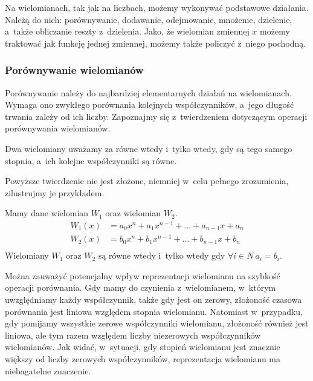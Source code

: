 Na wielomianach, tak jak na liczbach, możemy wykonywać podstawowe działania. Należą do nich: porównywanie, dodawanie, odejmowanie, mnożenie, dzielenie, a~także obliczanie reszty z~dzielenia. Jako, że wielomian zmiennej $x$ możemy traktować jak funkcję jednej zmiennej, możemy także policzyć z~niego pochodną.

\subsubsection{Porównywanie wielomianów}
Porównywanie należy do najbardziej elementarnych działań na wielomianach. Wymaga ono zwykłego porównania kolejnych współczynników, a~jego długość trwania zależy od ich liczby. Zapoznajmy się z~twierdzeniem dotyczącym operacji porównywania wielomianów.

\begin{theorem}
	$ $\\
	Dwa wielomiany uważamy za równe wtedy i~tylko wtedy, gdy są tego samego stopnia, a~ich kolejne współczynniki są równe.
\end{theorem}

Powyższe twierdzenie nie jest złożone, niemniej w~celu pełnego zrozumienia, zilustrujmy je przykładem. 

\begin{example}
	$ $\\
	Mamy dane wielomian $W_1$ oraz wielomian $W_2$.
	\begin{equation*}
	\begin{split}
	W_1(x) &= a_0x^n + a_1x^{n-1} + ... + a_{n-1}x + a_n \\
	W_2(x) &= b_0x^n + b_1x^{n-1} + ... + b_{n-1}x + b_n \\
	\end{split}
	\end{equation*}
	Wielomiany $W_1$ oraz $W_2 $ są równe wtedy i~tylko wtedy gdy
	$\forall{i\in N}\ a_i = b_i$.
\end{example}

Można zauważyć potencjalny wpływ reprezentacji wielomianu na szybkość operacji porównania. Gdy mamy do czynienia z~wielomianem, w~którym uwzględniamy każdy współczynnik, także gdy jest on zerowy, złożoność czasowa porównania jest liniowa względem stopnia wielomianu. Natomiast w~przypadku, gdy pomijamy wszystkie zerowe współczynniki wielomianu, złożoność również jest liniowa, ale tym razem względem liczby niezerowych współczynników wielomianów. Jak widać, w~sytuacji, gdy stopień wielomianu jest znacznie większy od liczby zerowych współczynników, reprezentacja wielomianu ma niebagatelne znaczenie.

